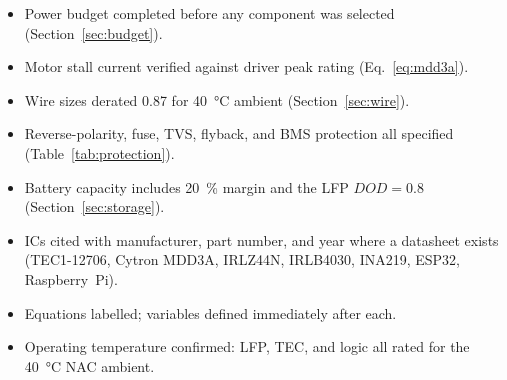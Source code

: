 \documentclass[11pt,a4paper]{article}
\begin{document}
\begin{itemize}
\item[\checkmark] Power budget completed before any component was selected
  (Section~\ref{sec:budget}).
\item[\checkmark] Motor stall current verified against driver peak rating
  (Eq.~\eqref{eq:mdd3a}).
\item[\checkmark] Wire sizes derated \num{0.87} for \SI{40}{\degreeCelsius}
  ambient (Section~\ref{sec:wire}).
\item[\checkmark] Reverse-polarity, fuse, TVS, flyback, and BMS protection all
  specified (Table~\ref{tab:protection}).
\item[\checkmark] Battery capacity includes \SI{20}{\percent} margin and the LFP
  $DOD=\num{0.8}$ (Section~\ref{sec:storage}).
\item[\checkmark] ICs cited with manufacturer, part number, and year where a
  datasheet exists (TEC1-12706, Cytron MDD3A, IRLZ44N, IRLB4030, INA219, ESP32,
  Raspberry~Pi).
\item[\checkmark] Equations labelled; variables defined immediately after each.
\item[\checkmark] Operating temperature confirmed: LFP, TEC, and logic all rated
  for the \SI{40}{\degreeCelsius} NAC ambient.
\end{itemize}



\end{document}
